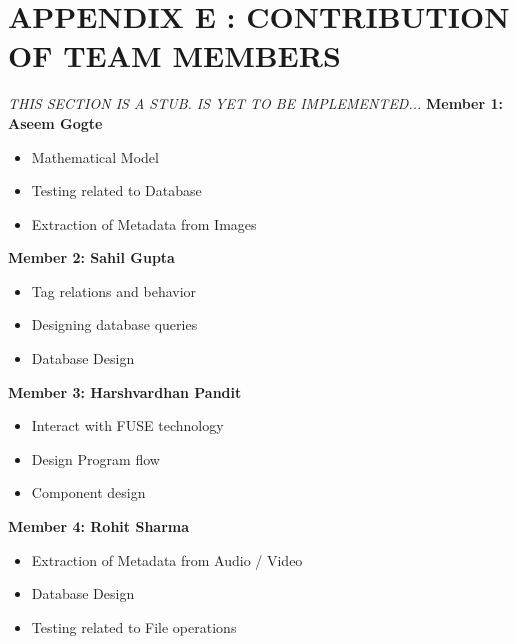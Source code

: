 \section*{APPENDIX E : CONTRIBUTION OF TEAM MEMBERS} 
\emph{THIS SECTION IS A STUB. IS YET TO BE IMPLEMENTED...}
\noindent \textbf{Member 1: Aseem Gogte} 
\begin{itemize}
\item Mathematical Model
\item Testing related to Database 
\item Extraction of Metadata from Images \\
\end{itemize}

\noindent \textbf{Member 2: Sahil Gupta}
\begin{itemize}
\item Tag relations and behavior
\item Designing database queries
\item Database Design \\
\end{itemize}

\noindent \textbf {Member 3: Harshvardhan Pandit} 
\begin{itemize}
\item Interact with FUSE technology
\item Design Program flow
\item Component design \\
\end{itemize}

\noindent \textbf {Member 4: Rohit Sharma} 
\begin{itemize}
\item Extraction of Metadata from Audio / Video 
\item Database Design
\item Testing related to File operations
\end{itemize}

